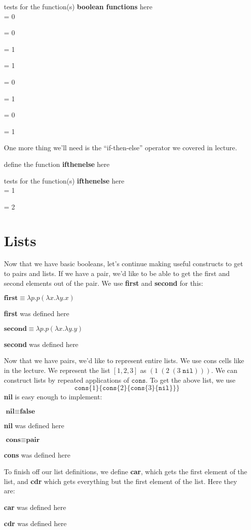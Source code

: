 \documentclass{article}
\newcommand{\op}[1]{\textbf{#1}}
\newcommand{\lcalc}[1]{\begin{center}\ensuremath{#1}\end{center}}
\newcommand{\error}[1]{Something went wrong.}
\newcommand{\begintodo}[1]{\begin{center}define the function \op{#1} here\end{center}}
\newcommand{\begindone}[1]{\begin{center}\op{#1} was defined here\end{center}}
\newcommand{\finishtodo}[1]{}
\newcommand{\finishdone}[1]{}
\newcommand{\test}[2]{#1 = #2\par}
\newcommand{\begintests}[1]{\begin{center}tests for the function(s) \op{#1} here\\}
\newcommand{\finishtests}[1]{\end{center}}
\renewcommand{\c}[2]{\texttt{cons}\{#1\}\{#2\}}
\begin{document}
\begintests{boolean functions}
\test{}{0}
\test{}{0}
\test{}{1}
\test{}{1}
\test{}{0}
\test{}{1}
\test{}{0}
\test{}{1}
\finishtests{boolean functions}

One more thing we'll need is the ``if-then-else'' operator we covered in lecture.
\begintodo{ifthenelse}
\newcommand{\ifthenelse}[3]{#1{#2}{#3}}
\finishtodo{ifthenelse}

\begintests{ifthenelse}
\test{\ifthenelse{\true}{1}{\error}}{1}
\test{\ifthenelse{\false}{\error}{2}}{2}
\finishtests{ifthenelse}

\section{Lists}
Now that we have basic booleans, let's continue making useful constructs to get to
pairs and lists.  If we have a pair, we'd like to be able to get the first and
second elements out of the pair.  We use \op{first} and \op{second} for this:

\lcalc{\op{first} \equiv \lambda p . p (\lambda x. \lambda y. x)}
\begindone{first}
\newcommand{\first}[1]{#1{\true}}
\finishdone{first}

\lcalc{\op{second} \equiv \lambda p . p (\lambda x. \lambda y. y)}
\begindone{second}
\newcommand{\second}[1]{#1{\false}}
\finishdone{second}

Now that we have pairs, we'd like to represent entire lists.  We use
cons cells like in the lecture. We represent the list $[1, 2, 3]$ as
$(1\;(2\;(3\;\texttt{nil})))$. We can construct lists by repeated 
applications of $\texttt{cons}$. To get the above list, we use
$$\c{1}{\c{2}{\c{3}{\texttt{nil}}}}$$
\op{nil} is easy enough to implement:

\lcalc{\op{nil} \equiv \op{false}}
\begindone{nil}
\newcommand{\nil}{\false}
\finishdone{nil}

\lcalc{\op{cons} \equiv \op{pair}}
\begindone{cons}
\newcommand{\cons}{\pair}
\finishdone{cons}

To finish off our list definitions, we define \op{car}, which gets the first
element of the list, and \op{cdr} which gets everything but the first element
of the list.  Here they are:

\begindone{car}
\newcommand{\car}{\first}
\finishdone{car}
\begindone{cdr}
\newcommand{\cdr}{\second}
\finishdone{cdr}
\end{document}
